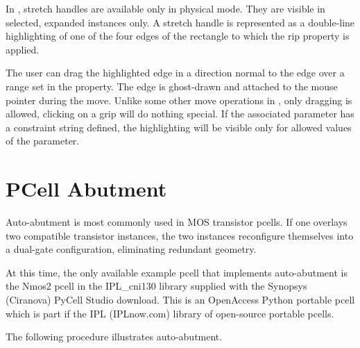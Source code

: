 In {\Xic}, stretch handles are available only in physical mode.  They
are visible in selected, expanded instances only.  A stretch handle is
represented as a double-line highlighting of one of the four edges of
the rectangle to which the {\et rip} property is applied.

The user can drag the highlighted edge in a direction normal to the
edge over a range set in the property.  The edge is ghost-drawn and
attached to the mouse pointer during the move.  Unlike some other move
operations in {\Xic}, only dragging is allowed, clicking on a grip
will do nothing special.  If the associated parameter has a constraint
string defined, the highlighting will be visible only for allowed
values of the parameter.



\section{PCell Abutment}
\label{pcabut}
Auto-abutment is most commonly used in MOS transistor pcells.  If one
overlays two compatible transistor instances, the two instances
reconfigure themselves into a dual-gate configuration, eliminating
redundant geometry.

At this time, the only available example pcell that implements
auto-abutment is the Nmos2 pcell in the IPL\_cni130 library supplied
with the Synopsys (Ciranova) PyCell Studio download.  This is an
OpenAccess Python portable pcell which is part if the IPL (IPLnow.com)
library of open-source portable pcells.

The following procedure illustrates auto-abutment.

